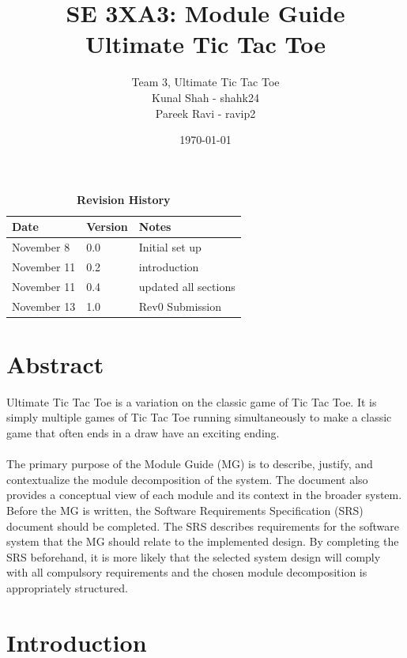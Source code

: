 \documentclass[12pt, titlepage]{article}
\title{SE 3XA3: Module Guide\\Ultimate Tic Tac Toe}
\author{Team 3, Ultimate Tic Tac Toe
		\\ Kunal Shah - shahk24
		\\ Pareek Ravi - ravip2
}
\date{\today}
\begin{document}
\maketitle

\tableofcontents
\listoftables
\listoffigures

\begin{table}[bp]
\caption{\bf Revision History }
\begin{tabularx}{\textwidth}{p{3cm}p{2cm}X}
\toprule {\bf Date} & {\bf Version} & {\bf Notes}\\
\midrule
November 8  & 0.0 & Initial set up\\
November 11 & 0.2 & introduction \\
November 11 & 0.4 & updated all sections \\
November 13 & 1.0 & Rev0 Submission\\
\bottomrule
\end{tabularx}
\end{table}

\newpage


\section*{Abstract}
Ultimate Tic Tac Toe is a variation on the classic game of Tic Tac Toe. It is 
simply multiple games of Tic Tac Toe running simultaneously to make a classic 
game that often ends in a draw have an exciting ending.\\\\
The primary purpose of the Module Guide (MG) is to describe, justify, and
contextualize the module decomposition of the system. The document also provides
a conceptual view of each module and its context in the broader system. Before
the MG is written, the Software Requirements Specification (SRS) document should
be completed. The SRS describes requirements for the software system that the MG
should relate to the implemented design. By completing the SRS beforehand, it
is more likely that the selected system design will comply with all compulsory
requirements and the chosen module decomposition is appropriately structured.

\section{Introduction}
\end{document}
